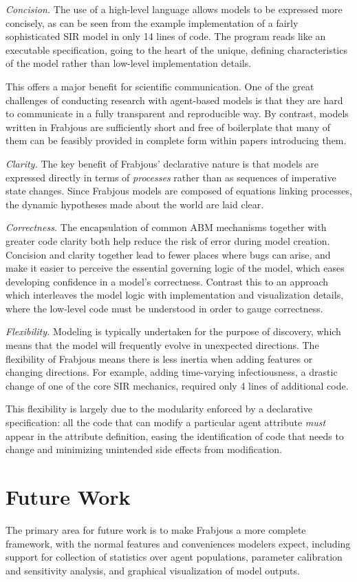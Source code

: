 \documentclass[oribibl]{llncs}
\begin{document}
\emph{Concision.}
The use of a high-level language allows models to be expressed more concisely, as can be seen from the example implementation of a fairly sophisticated SIR model in only 14 lines of code. The program reads like an executable specification, going to the heart of the unique, defining characteristics of the model rather than low-level implementation details.

 This offers a major benefit for scientific communication. One of the great challenges of conducting research with agent-based models is that they are hard to communicate in a fully transparent and reproducible way. By contrast, models written in Frabjous are sufficiently short and free of boilerplate that many of them can be feasibly provided in complete form within papers introducing them.

\emph{Clarity.}
The key benefit of Frabjous' declarative nature is that models are expressed directly in terms of \emph{processes} rather than as sequences of imperative state changes. Since Frabjous models are composed of equations linking processes, the dynamic hypotheses made about the world are laid clear.

\emph{Correctness.} 
The encapsulation of common ABM mechanisms together with greater code clarity both help reduce the risk of error during model creation. Concision and clarity together lead to fewer places where bugs can arise, and make it easier to perceive the essential governing logic of the model, which eases developing confidence in a model's correctness. Contrast this to an approach which interleaves the model logic with implementation and visualization details, where the low-level code must be understood in order to gauge correctness.

\emph{Flexibility.}
Modeling is typically undertaken for the purpose of discovery, which means that the model will frequently evolve in unexpected directions. The flexibility of Frabjous means there is less inertia when adding features or changing directions. For example, adding time-varying infectiousness, a drastic change of one of the core SIR mechanics, required only 4 lines of additional code. 
 
 This flexibility is largely due to the modularity enforced by a declarative specification: all the code that can modify a particular agent attribute \emph{must} appear in the attribute definition, easing the identification of code that needs to change and minimizing unintended side effects from modification.

\section{Future Work}
The primary area for future work is to make Frabjous a more complete framework, with the normal features and conveniences modelers expect, including support for collection of statistics over agent populations, parameter calibration and sensitivity analysis, and graphical visualization of model outputs.
\end{document}
